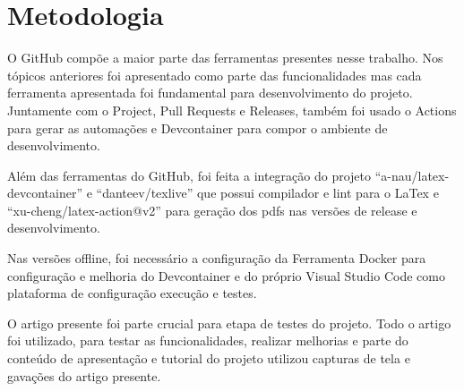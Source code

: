 \section{Metodologia}

O GitHub compõe a maior parte das ferramentas presentes nesse trabalho. Nos tópicos anteriores foi apresentado como parte das funcionalidades mas cada ferramenta apresentada foi fundamental para desenvolvimento do projeto. 
Juntamente com o Project, Pull Requests e Releases, também foi usado o Actions para gerar as automações e Devcontainer para compor o ambiente de desenvolvimento.

Além das ferramentas do GitHub, foi feita a integração do projeto ``a-nau/latex-devcontainer'' e ``danteev/texlive'' que possui compilador e lint para o LaTex e ``xu-cheng/latex-action@v2'' para geração dos pdfs nas versões de release e desenvolvimento.

Nas versões offline, foi necessário a configuração da Ferramenta Docker para configuração e melhoria do Devcontainer e do próprio Visual Studio Code como plataforma de configuração execução e testes.

O artigo presente foi parte crucial para etapa de testes do projeto. Todo o artigo foi utilizado, para testar as funcionalidades, realizar melhorias e parte do conteúdo de apresentação e tutorial do projeto utilizou capturas de tela e gavações do artigo presente.